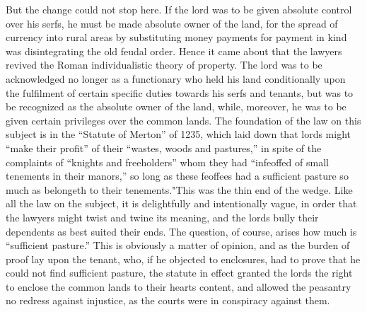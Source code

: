 \documentclass{book}
\begin{document}
But the change could not stop here. If the lord was to be given absolute control over his serfs, he must be made absolute owner of the land, for the spread of currency into rural areas by substituting money payments for payment in kind was disintegrating the old feudal order. Hence it came about that the lawyers revived the Roman individualistic theory of property. The lord was to be acknowledged no longer as a functionary who held his land conditionally upon the fulfilment of certain specific duties towards his serfs and tenants, but was to be recognized as the absolute owner of the land, while, moreover, he was to be given certain privileges over the common lands. The foundation of the law on this subject is in the “Statute of Merton” of 1235, which laid down that lords might “make their profit” of their “wastes, woods and pastures,” in spite of the complaints of “knights and freeholders” whom they had “infeoffed of small tenements in their manors,” so long as these feoffees had a sufficient pasture so much as belongeth to their tenements."\footnotemark[5] This was the thin end of the wedge. Like all the law on the subject, it is delightfully and intentionally vague, in order that the lawyers might twist and twine its meaning, and the lords bully their dependents as best suited their ends. The question, of course, arises how much is “sufficient pasture.” This is obviously a matter of opinion, and as the burden of proof lay upon the tenant, who, if he objected to enclosures, had to prove that he could not find sufficient pasture, the statute in effect granted the lords the right to enclose the common lands to their hearts content, and allowed the peasantry no redress against injustice, as the courts were in conspiracy against them.
\end{document}
